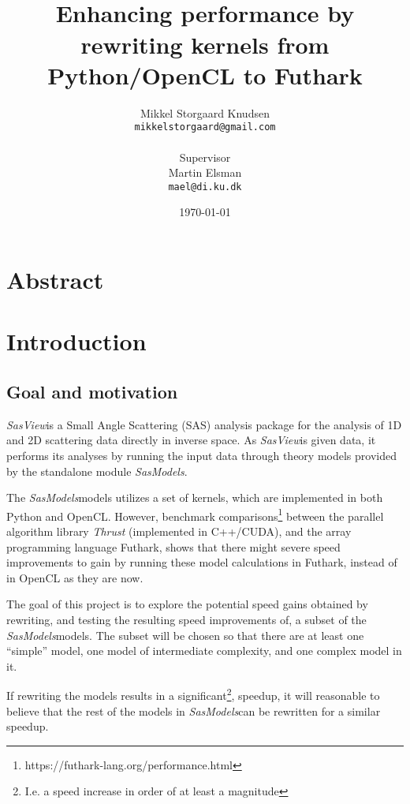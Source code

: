 \documentclass[11pt]{article}
\title{
  \vspace{3cm}
  \Huge{\futhark}\\
  \Large{Enhancing performance by rewriting kernels from Python/OpenCL to
    Futhark}
}
\author{
  \Large{Mikkel Storgaard Knudsen}\\
  \texttt{mikkelstorgaard@gmail.com}\\
  \\
  \Large{Supervisor}\\
  Martin Elsman\\
  \texttt{mael@di.ku.dk}
}
\date{
    \today
}
\def \ColourPDF {include/ku-farve}
\def \TitlePDF   {include/ku-en}  %
\newcommand{\sasmodels}{\textit{SasModels}}
\newcommand{\sasview}{\textit{SasView}}
\begin{document}


\clearpage\maketitle
\thispagestyle{empty}

\section*{Abstract}

\newpage

\section{Introduction}
\subsection{Goal and motivation}
\sasview is a Small Angle Scattering (SAS) analysis package for the
analysis of 1D and 2D scattering data directly in inverse space.
As \sasview is given data, it performs its analyses by running the
input data through theory models provided by the standalone module
\sasmodels.

The \sasmodels models utilizes a set of kernels, which are implemented
in both Python and OpenCL. However, benchmark
comparisons\footnote{https://futhark-lang.org/performance.html}
between the parallel algorithm library \textit{Thrust}
(implemented in C++/CUDA), and the array programming language Futhark, shows
that there might severe speed improvements to gain by running these model
calculations in Futhark, instead of in OpenCL as they are now.

The goal of this project is to explore the potential speed gains obtained by
rewriting, and testing the resulting speed improvements of, a subset of the
\sasmodels models.
The subset will be chosen so that there are at least
one ``simple'' model, one model of intermediate complexity, and one complex
model in it.

If rewriting the models results in a significant\footnote{I.e. a speed increase
  in order of at least a magnitude}, speedup, it will reasonable to believe that 
  the rest of the models in \sasmodels can be rewritten for a similar
  speedup.
\end{document}
